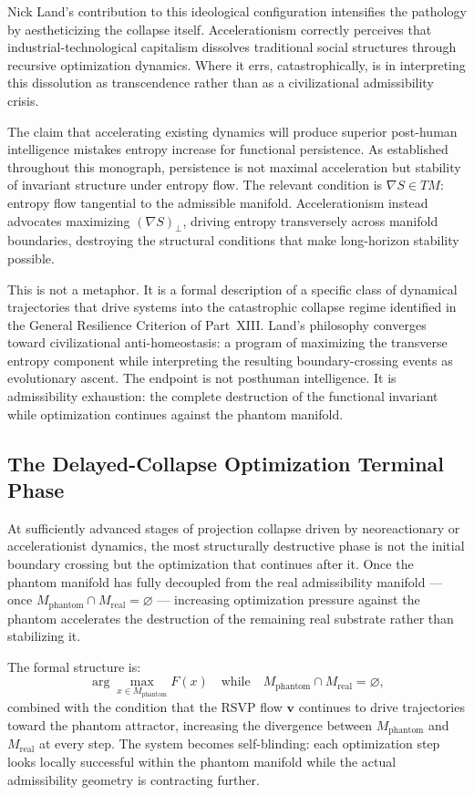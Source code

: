 \documentclass[12pt, a4paper]{article}
\theoremstyle{essaystyle}
\begin{document}
Nick Land's contribution to this ideological configuration intensifies the pathology
by aestheticizing the collapse itself. Accelerationism correctly perceives that
industrial-technological capitalism dissolves traditional social structures through
recursive optimization dynamics. Where it errs, catastrophically, is in interpreting
this dissolution as transcendence rather than as a civilizational admissibility crisis.

The claim that accelerating existing dynamics will produce superior post-human
intelligence mistakes entropy increase for functional persistence. As established
throughout this monograph, persistence is not maximal acceleration but stability of
invariant structure under entropy flow. The relevant condition is $\nabla S \in TM$:
entropy flow tangential to the admissible manifold. Accelerationism instead advocates
maximizing $(\nabla S)_\perp$, driving entropy transversely across manifold boundaries,
destroying the structural conditions that make long-horizon stability possible.

This is not a metaphor. It is a formal description of a specific class of dynamical
trajectories that drive systems into the catastrophic collapse regime identified in
the General Resilience Criterion of Part~XIII. Land's philosophy converges toward
civilizational anti-homeostasis: a program of maximizing the transverse entropy
component while interpreting the resulting boundary-crossing events as evolutionary
ascent. The endpoint is not posthuman intelligence. It is admissibility exhaustion:
the complete destruction of the functional invariant while optimization continues
against the phantom manifold.

\subsection{The Delayed-Collapse Optimization Terminal Phase}

At sufficiently advanced stages of projection collapse driven by neoreactionary or
accelerationist dynamics, the most structurally destructive phase is not the initial
boundary crossing but the optimization that continues after it. Once the phantom
manifold has fully decoupled from the real admissibility manifold --- once
$M_{\mathrm{phantom}} \cap M_{\mathrm{real}} = \varnothing$ --- increasing
optimization pressure against the phantom accelerates the destruction of the
remaining real substrate rather than stabilizing it.

The formal structure is:
\[
\arg\max_{x \in M_{\mathrm{phantom}}} F(x)
\quad \text{while} \quad
M_{\mathrm{phantom}} \cap M_{\mathrm{real}} = \varnothing,
\]
combined with the condition that the RSVP flow $\mathbf{v}$ continues to drive
trajectories toward the phantom attractor, increasing the divergence between
$M_{\mathrm{phantom}}$ and $M_{\mathrm{real}}$ at every step. The system becomes
self-blinding: each optimization step looks locally successful within the phantom
manifold while the actual admissibility geometry is contracting further.
\end{document}
